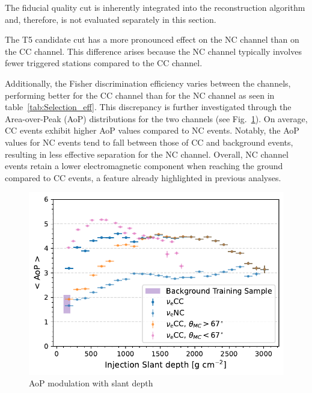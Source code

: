 The fiducial quality cut is inherently integrated into the reconstruction algorithm and, therefore, is not evaluated separately in this section.

The T5 candidate cut has a more pronounced effect on the NC channel than on the CC channel. This difference arises because the NC channel typically involves fewer triggered stations compared to the CC channel.


Additionally, the Fisher discrimination efficiency varies between the channels, performing better for the CC channel than for the NC channel as seen in table~\ref{tab:Selection_eff}. This discrepancy is further investigated through the Area-over-Peak (AoP) distributions for the two channels (see Fig.~\ref{fig:AoP_v_X}). On average, CC events exhibit higher AoP values compared to NC events. Notably, the AoP values for NC events tend to fall between those of CC and background events, resulting in less effective separation for the NC channel. Overall, NC channel events retain a lower electromagnetic component when reaching the ground compared to CC events, a feature already highlighted in previous analyses.

\begin{figure}[t!]
  \centering
  \includegraphics[width=\textwidth]{thesis_figures/Nu_analysis/Nu_eff/Selection_Evo_AoP_X_MC_wnt_redcut.pdf}
  \caption{AoP modulation with slant depth }
  \label{fig:AoP_v_X}
\end{figure}

